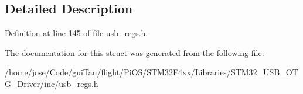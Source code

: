 \subsection{Detailed Description}


Definition at line 145 of file usb\-\_\-regs.\-h.



The documentation for this struct was generated from the following file\-:\begin{DoxyCompactItemize}
\item 
/home/jose/\-Code/gui\-Tau/flight/\-Pi\-O\-S/\-S\-T\-M32\-F4xx/\-Libraries/\-S\-T\-M32\-\_\-\-U\-S\-B\-\_\-\-O\-T\-G\-\_\-\-Driver/inc/\hyperlink{_s_t_m32_f4xx_2_libraries_2_s_t_m32___u_s_b___o_t_g___driver_2inc_2usb__regs_8h}{usb\-\_\-regs.\-h}\end{DoxyCompactItemize}
